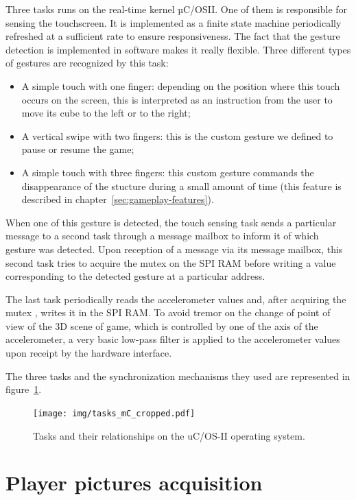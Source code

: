 \documentclass[english, DIV=13]{scrreprt}
\begin{document}
Three tasks runs on the real-time kernel µC/OSII. One of them is responsible
for sensing the touchscreen. It is implemented as a finite state machine periodically
refreshed at a sufficient rate to ensure responsiveness. The fact that the gesture
detection is implemented in software makes it really flexible. Three different types of
gestures are recognized by this task:
\begin{itemize}
    \item A simple touch with one finger: depending on the position where this touch
    occurs on the screen, this is interpreted as an instruction from the user to move
    its cube to the left or to the right;
    \item A vertical swipe with two fingers: this is the custom gesture we defined to
    pause or resume the game;
    \item A simple touch with three fingers: this custom gesture commands the
    disappearance of the stucture during a small amount of time (this feature is
    described in chapter~\ref{sec:gameplay-features}).
\end{itemize}
When one of this gesture is detected, the touch sensing task sends a particular
message to a second task through a message mailbox to inform it of which gesture
was detected. Upon reception of a message via its message mailbox, this second task
tries to acquire the mutex on the SPI RAM before writing a value corresponding
to the detected gesture at a particular address.

The last task periodically reads the accelerometer values and, after acquiring
the mutex , writes it in the SPI RAM. To avoid tremor on the change of point of
view of the 3D scene of game, which is controlled by one of the axis of the
accelerometer, a very basic low-pass filter is applied to the accelerometer
values upon receipt by the hardware interface.

The three tasks and the synchronization mechanisms they used are represented in
figure~\ref{fig:tasks-mc}.

\begin{figure}[bth]
    \centering
    \texttt{[image: img/tasks\_mC\_cropped.pdf]}
    \caption{Tasks and their relationships on the uC/OS-II operating system.}
    \label{fig:tasks-mc}
\end{figure}


\chapter{Player pictures acquisition}
\label{chap:pic-acq}
\end{document}
